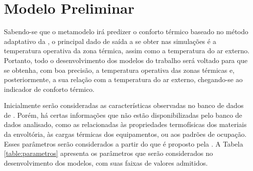 \documentclass[brazil,hardcopy,openany,a5paper]{ufscthesis}
\begin{document}
		\section{Modelo Preliminar}
		
		Sabendo-se que o metamodelo irá predizer o conforto térmico baseado no método adaptativo da  \cite{ASHRAEStandard552017}, o principal dado de saída a se obter nas simulações é a temperatura operativa da zona térmica, assim como a temperatura do ar externo. Portanto, todo o desenvolvimento dos modelos do trabalho será voltado para que se obtenha, com boa precisão, a temperatura operativa das zonas térmicas e, posteriormente, a sua relação com a temperatura do ar externo, chegando-se ao indicador de conforto térmico.
		
		Inicialmente serão consideradas as características observadas no banco de dados de  \cite{Pereira2018}. Porém, há certas informações que não estão disponibilizadas pelo banco de dados analisado, como as relacionadas às propriedades termofísicas dos materiais da envoltória, às cargas térmicas dos equipamentos, ou aos padrões de ocupação. Esses parâmetros serão considerados a partir do que é proposto pela  \cite{INIC}. A Tabela \ref{table:parametros} apresenta os parâmetros que serão considerados no desenvolvimento dos modelos, com suas faixas de valores admitidos.	
		
		
		
\end{document}
